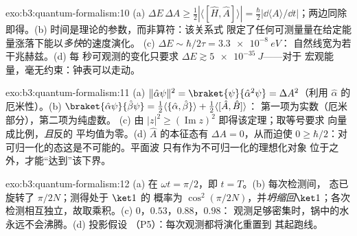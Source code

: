 \begin{solution}{exo:b3:quantum-formalism:10}
(a) $\Delta E\,\Delta A \ge \tfrac12|\langle[\hat H, \hat
A]\rangle| = \tfrac\hbar2|\dd\langle A\rangle/\dd t|$；两边同除即得。(b)
时间是理论的参数，而非算符：该关系式
限定了任何可测量量在给定能量涨落下能以\emph{多快}的速度演化。
(c) $\Delta E \sim \hbar/2\tau = \qty{3.3e-8}{eV}$：
自然线宽为若干兆赫兹。(d) 每
秒可观测的变化只要求 $\Delta E \gtrsim \qty{5e-35}{J}$——对于
宏观能量，毫无约束：钟表可以走动。
\end{solution}

\begin{solution}{exo:b3:quantum-formalism:11}
(a) $\|\hat\alpha\psi\|^2 = \braket{\psi}{\hat\alpha^2\psi} =
\Delta A^2$（利用 $\hat\alpha$ 的厄米性）。(b) $\braket{\hat\alpha
\psi}{\hat\beta\psi} = \tfrac12\langle\{\hat\alpha,
\hat\beta\}\rangle + \tfrac12\langle[\hat A, \hat B]\rangle$：
第一项为实数（厄米部分），第二项为纯虚数。
(c) 由 $|z|^2 \ge (\operatorname{Im}z)^2$ 即得该定理；取等号要求
向量成比例，\emph{且}反的
平均值为零。(d) $\hat A$ 的本征态有 $\Delta A = 0$，从而迫使
$0 \ge \hbar/2$：对可归一化的态这是不可能的。平面波
只有作为不可归一化的理想化对象
位于之外，才能“达到”该下界。
\end{solution}

\begin{solution}{exo:b3:quantum-formalism:12}
(a) 在 $\omega t = \pi/2$，即 $t = T$。(b) 每次检测间，
态已旋转了 $\pi/2N$；测得处于 $\ket1$ 的
概率为 $\cos^2(\pi/2N)$，并\emph{坍缩回}$\ket1$；各次
检测相互独立，故取乘积。(c) $0$，$0.53$，$0.88$，$0.98$：
观测足够密集时，锅中的水永远不会沸腾。(d) 投影假设
（P5）：每次观测都将演化重置到
其起跑线。
\end{solution}

